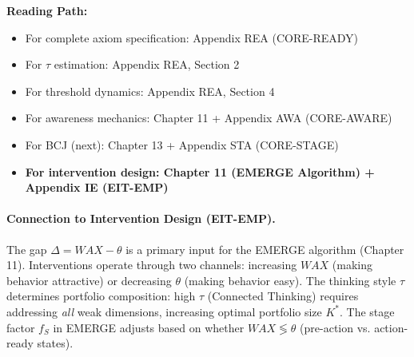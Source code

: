 \begin{cross-reference}
\textbf{Reading Path:}
\begin{itemize}
    \item For complete axiom specification: Appendix REA (CORE-READY)
    \item For $\tau$ estimation: Appendix REA, Section 2
    \item For threshold dynamics: Appendix REA, Section 4
    \item For awareness mechanics: Chapter 11 + Appendix AWA (CORE-AWARE)
    \item For BCJ (next): Chapter 13 + Appendix STA (CORE-STAGE)
    \item \textbf{For intervention design: Chapter 11 (EMERGE Algorithm) + Appendix IE (EIT-EMP)}
\end{itemize}
\end{cross-reference}

\paragraph{Connection to Intervention Design (EIT-EMP).}
The gap $\Delta = WAX - \theta$ is a primary input for the EMERGE algorithm (Chapter 11).
Interventions operate through two channels: increasing $WAX$ (making behavior attractive)
or decreasing $\theta$ (making behavior easy). The thinking style $\tau$ determines
portfolio composition: high $\tau$ (Connected Thinking) requires addressing \emph{all}
weak dimensions, increasing optimal portfolio size $K^*$. The stage factor $f_S$ in EMERGE
adjusts based on whether $WAX \lessgtr \theta$ (pre-action vs. action-ready states).

